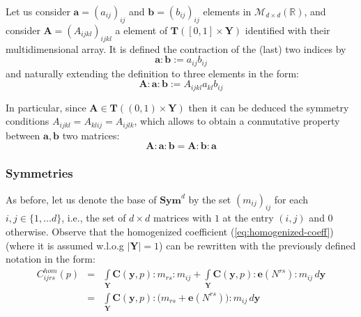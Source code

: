\begin{defn}
Let us consider $\mathbf{a} = (a_{ij})_{ij}$ and $\mathbf{b} = (b_{ij})_{ij}$ elements in $\mathcal{M}_{d\times d}(\mathbb{R})$, and consider $\mathbf{A}=(A_{ijkl})_{ijkl}$ a element of $\mathbf{T}([0,1]\times \mathbf{Y})$ identified with their multidimensional array. It is defined the contraction of the (last) two indices by
\begin{equation*}
    \mathbf{a}:\mathbf{b} := a_{ij}b_{ij}
\end{equation*}
and naturally extending the definition to three elements in the form:
\begin{equation*}
    \mathbf{A}:\mathbf{a}:\mathbf{b} := A_{ijkl}a_{kl}b_{ij}
\end{equation*}
\end{defn}
\begin{rem}
In particular, since $\mathbf{A} \in \mathbf{T}((0,1)\times \mathbf{Y})$ then it can be deduced the symmetry conditions $A_{ijkl}=A_{klij}=A_{ijlk}$, which allows to obtain a conmutative property between $\mathbf{a},\mathbf{b}$ two matrices:
\begin{equation}
    \mathbf{A}: \mathbf{a}:\mathbf{b}= \mathbf{A}:\mathbf{b}:\mathbf{a}
\end{equation}
\end{rem}


\subsubsection{Symmetries}
As before, let us denote the base of $\mathbf{Sym}^d$ by the set $(m_{ij})_{ij}$ for each $i,j \in \{1,\dots d\}$, i.e., the set of $d \times d$ matrices with $1$ at the entry $(i,j)$ and $0$ otherwise. Observe that the homogenized coefficient (\ref{eq:homogenized-coeff}) (where it is assumed w.l.o.g $\vert \mathbf{Y} \vert = 1$) can be rewritten with the previously defined notation in the form:
\begin{equation}
    \label{eq:effective_coef}
    \begin{array}{ccc}
        C_{ijrs}^{hom}(p) &=& \int\limits_{\mathbf{Y}} \mathbf{C}(\mathbf{y},p):m_{rs}:m_{ij} + \int\limits_{\mathbf{Y}} \mathbf{C}(\mathbf{y},p):\mathbf{e}(N^{rs}):m_{ij} \, d\mathbf{y} \\
         &=&\int\limits_{\mathbf{Y}} \mathbf{C}(\mathbf{y},p):\big(m_{rs} + \mathbf{e}(N^{rs})\big):m_{ij} \, d\mathbf{y}
    \end{array}
\end{equation}

